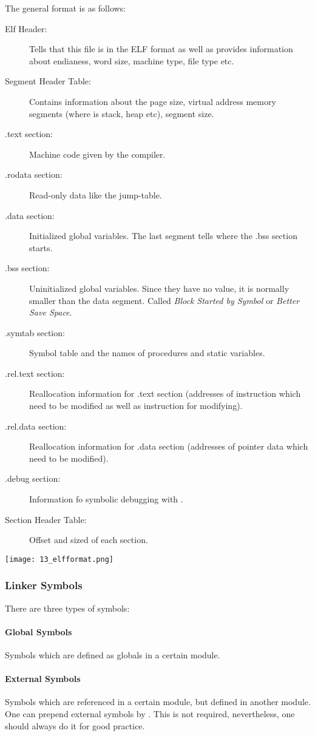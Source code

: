 The general format is as follows:
\begin{description}
    \item[Elf Header:] Tells that this file is in the ELF format as well as provides information about endianess, word size, machine type, file type etc.
    \item[Segment Header Table:] Contains information about the page size, virtual address memory segments (where is stack, heap etc), segment size.
    \item[.text section:] Machine code given by the compiler.
    \item[.rodata section:] Read-only data like the jump-table.
    \item[.data section:] Initialized global variables. The last segment tells where the .bss section starts.
    \item[.bss section:] Uninitialized global variables. Since they have no value, it is normally smaller than the data segment. Called \textit{Block Started by Symbol} or \textit{Better Save Space}.
    \item[.symtab section:] Symbol table and the names of procedures and static variables.
    \item[.rel.text section:] Reallocation information for .text section (addresses of instruction which need to be modified as well as instruction for modifying).
    \item[.rel.data section:] Reallocation information for .data section (addresses of pointer data which need to be modified).
    \item[.debug section:] Information fo symbolic debugging with .
    \item[Section Header Table:] Offset and sized of each section.
\end{description}

\texttt{[image: 13\_elfformat.png]}

\subsubsection{Linker Symbols}
There are three types of symbols:
\paragraph{Global Symbols}
Symbols which are defined as globals in a certain module.

\paragraph{External Symbols}
Symbols which are referenced in a certain module, but defined in another module. One can prepend external symbols by . This is not required, nevertheless, one should always do it for good practice.

